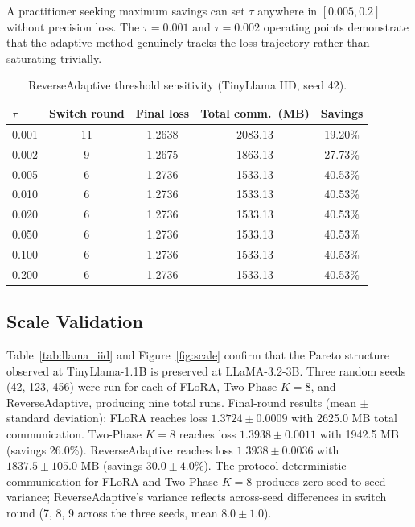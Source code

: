 A practitioner seeking maximum savings can set $\tau$ anywhere in $[0.005, 0.2]$ without precision loss. The $\tau{=}0.001$ and $\tau{=}0.002$ operating points demonstrate that the adaptive method genuinely tracks the loss trajectory rather than saturating trivially.

\begin{table}[t]
\caption{ReverseAdaptive threshold sensitivity (TinyLlama IID, seed 42).}
\label{tab:ablation}
\begin{center}
\begin{tabular}{lcccc}
\toprule
$\tau$ & Switch round & Final loss & Total comm.\ (MB) & Savings \\
\midrule
0.001 & 11 & 1.2638 & 2083.13 & 19.20\% \\
0.002 & 9  & 1.2675 & 1863.13 & 27.73\% \\
0.005 & 6  & 1.2736 & 1533.13 & 40.53\% \\
0.010 & 6  & 1.2736 & 1533.13 & 40.53\% \\
0.020 & 6  & 1.2736 & 1533.13 & 40.53\% \\
0.050 & 6  & 1.2736 & 1533.13 & 40.53\% \\
0.100 & 6  & 1.2736 & 1533.13 & 40.53\% \\
0.200 & 6  & 1.2736 & 1533.13 & 40.53\% \\
\bottomrule
\end{tabular}
\end{center}
\end{table}

\subsection{Scale Validation}
Table~\ref{tab:llama_iid} and Figure~\ref{fig:scale} confirm that the Pareto structure observed at TinyLlama-1.1B is preserved at LLaMA-3.2-3B. Three random seeds (42, 123, 456) were run for each of FLoRA, Two-Phase $K{=}8$, and ReverseAdaptive, producing nine total runs. Final-round results (mean $\pm$ standard deviation): FLoRA reaches loss $1.3724 \pm 0.0009$ with 2625.0 MB total communication. Two-Phase $K{=}8$ reaches loss $1.3938 \pm 0.0011$ with 1942.5 MB (savings 26.0\%). ReverseAdaptive reaches loss $1.3938 \pm 0.0036$ with $1837.5 \pm 105.0$ MB (savings $30.0 \pm 4.0$\%). The protocol-deterministic communication for FLoRA and Two-Phase $K{=}8$ produces zero seed-to-seed variance; ReverseAdaptive's variance reflects across-seed differences in switch round (7, 8, 9 across the three seeds, mean $8.0 \pm 1.0$).

